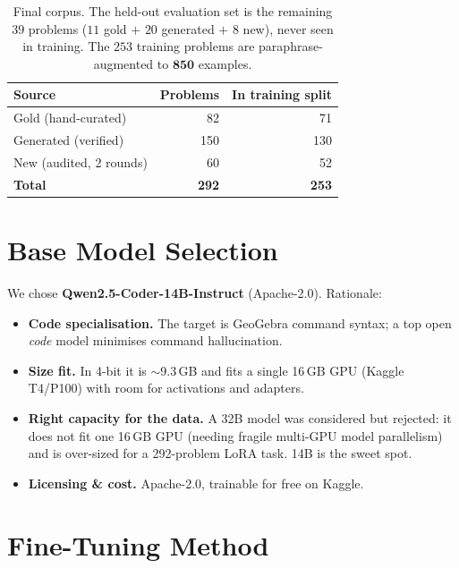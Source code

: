 \documentclass[11pt]{article}
\begin{document}
\begin{table}[h]
\centering
\begin{tabular}{lrr}
\toprule
Source & Problems & In training split \\
\midrule
Gold (hand-curated)      & 82  & 71 \\
Generated (verified)     & 150 & 130 \\
New (audited, 2 rounds)  & 60  & 52 \\
\midrule
\textbf{Total}           & \textbf{292} & \textbf{253} \\
\bottomrule
\end{tabular}
\caption{Final corpus. The held-out evaluation set is the remaining
$39$ problems ($11$ gold $+$ $20$ generated $+$ $8$ new), never seen in
training. The $253$ training problems are paraphrase-augmented to
$\mathbf{850}$ examples.}
\end{table}

\section{Base Model Selection}
We chose \textbf{Qwen2.5-Coder-14B-Instruct} (Apache-2.0). Rationale:
\begin{itemize}[noitemsep,topsep=2pt]
  \item \textbf{Code specialisation.} The target is GeoGebra command syntax;
  a top open \emph{code} model minimises command hallucination.
  \item \textbf{Size fit.} In 4-bit it is $\sim$9.3\,GB and fits a single
  16\,GB GPU (Kaggle T4/P100) with room for activations and adapters.
  \item \textbf{Right capacity for the data.} A 32B model was considered but
  rejected: it does not fit one 16\,GB GPU (needing fragile multi-GPU model
  parallelism) and is over-sized for a 292-problem LoRA task. 14B is the
  sweet spot.
  \item \textbf{Licensing \& cost.} Apache-2.0, trainable for free on Kaggle.
\end{itemize}

\section{Fine-Tuning Method}
\end{document}
